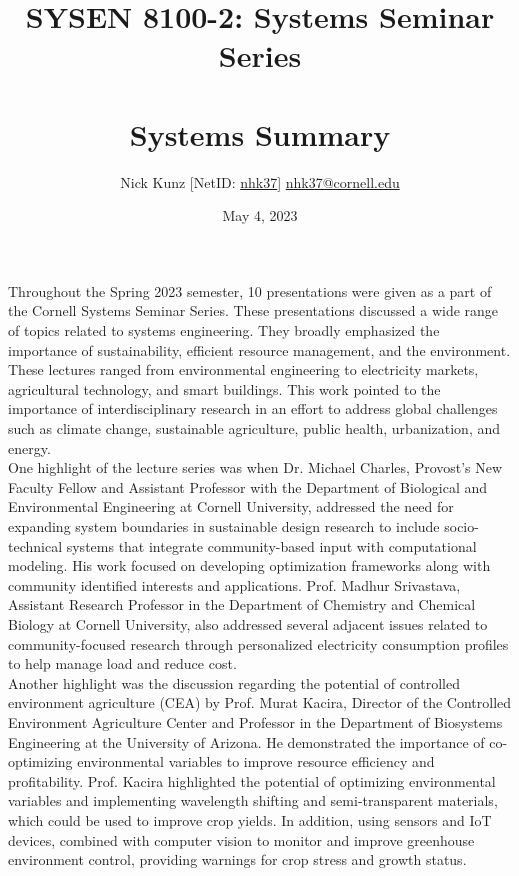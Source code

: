 \documentclass[11pt]{article}
\begin{document}
\title{SYSEN 8100-2: Systems Seminar Series\\~\\
    \Large Systems Summary
}
\author{
    Nick Kunz [NetID: \url{nhk37}] \hyperlink{nhk37@cornell.edu}{nhk37@cornell.edu}
}
\date{May 4, 2023}
\maketitle
Throughout the Spring 2023 semester, 10 presentations were given as a part of the Cornell Systems Seminar Series. These presentations discussed a wide range of topics related to systems engineering. They broadly emphasized the importance of sustainability, efficient resource management, and the environment. These lectures ranged from environmental engineering to electricity markets, agricultural technology, and smart buildings. This work pointed to the importance of interdisciplinary research in an effort to address global challenges such as climate change, sustainable agriculture, public health, urbanization, and energy.\\

One highlight of the lecture series was when Dr. Michael Charles, Provost’s New Faculty Fellow and Assistant Professor with the Department of Biological and Environmental Engineering at Cornell University, addressed the need for expanding system boundaries in sustainable design research to include socio-technical systems that integrate community-based input with computational modeling. His work focused on developing optimization frameworks along with community identified interests and applications. Prof. Madhur Srivastava, Assistant Research Professor in the Department of Chemistry and Chemical Biology at Cornell University, also addressed several adjacent issues related to community-focused research through personalized electricity consumption profiles to help manage load and reduce cost.\\

Another highlight was the discussion regarding the potential of controlled environment agriculture (CEA) by Prof. Murat Kacira, Director of the Controlled Environment Agriculture Center and Professor in the Department of Biosystems Engineering at the University of Arizona. He demonstrated the importance of co-optimizing environmental variables to improve resource efficiency and profitability. Prof. Kacira highlighted the potential of optimizing environmental variables and implementing wavelength shifting and semi-transparent materials, which could be used to improve crop yields. In addition, using sensors and IoT devices, combined with computer vision to monitor and improve greenhouse environment control, providing warnings for crop stress and growth status.\\
\end{document}
